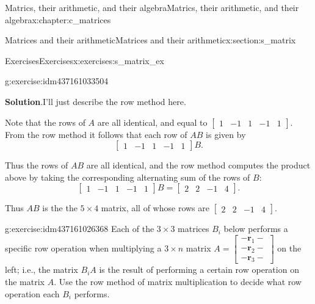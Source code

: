 \documentclass[oneside,10pt,]{book}
\newcommand{\blocktitlefont}{\relax}
\numberwithin{equation}{section}
\newcommand{\boldr}{{\mathbf r}}
\newcommand{\amp}{&}
\begin{document}
\begin{chapterptx}{Matrics, their arithmetic, and their algebra}{}{Matrics, their arithmetic, and their algebra}{}{}{x:chapter:c_matrices}
\begin{sectionptx}{Matrices and their arithmetic}{}{Matrices and their arithmetic}{}{}{x:section:s_matrix}
\begin{exercises-subsection-numberless}{Exercises}{}{Exercises}{}{}{x:exercises:s_matrix_ex}
\begin{divisionexercise}{4}{}{}{g:exercise:idm437161033504}
\begin{equation*}
\end{equation*}
%
\par\smallskip%
\noindent\textbf{\blocktitlefont Solution}.\hypertarget{g:solution:idm437161032144}{}\quad{}I'll just describe the row method here.%
\par
Note that the rows of \(A\) are all identical, and equal to \(\begin{bmatrix}1 \amp -1 \amp 1 \amp -1 \amp 1 \end{bmatrix}\). From the row method it follows that each row of \(AB\) is given by%
\begin{equation*}
\begin{bmatrix}1 \amp -1 \amp 1 \amp -1 \amp 1 \end{bmatrix} B\text{.}
\end{equation*}
%
\par
Thus the rows of \(AB\) are all identical, and the row method computes the product above by taking the corresponding alternating sum of the rows of \(B\):%
\begin{equation*}
\begin{bmatrix}1 \amp -1 \amp 1 \amp -1 \amp 1 \end{bmatrix} B=\begin{bmatrix}2\amp 2\amp -1\amp 4 \end{bmatrix}\text{.}
\end{equation*}
%
\par
Thus \(AB\) is the the \(5\times 4\) matrix, all of whose rows are \(\begin{bmatrix}2\amp 2\amp -1\amp 4 \end{bmatrix}\).%
\end{divisionexercise}%
\begin{divisionexercise}{5}{}{}{g:exercise:idm437161026368}%
Each of the \(3\times 3\) matrices \(B_i\) below performs a specific row operation when multiplying a \(3\times n\) matrix \(A=\begin{bmatrix}-\boldr_1-\\ -\boldr_2-\\ -\boldr_3- \end{bmatrix}\) on the left; i.e., the matrix \(B_iA\) is the result of performing a certain row operation on the matrix \(A\). Use the row method of matrix multiplication to decide what row operation each \(B_i\) performs.%
\begin{equation*}

\end{equation*}
\end{divisionexercise}
\end{exercises-subsection-numberless}
\end{sectionptx}
\end{chapterptx}
\end{document}
